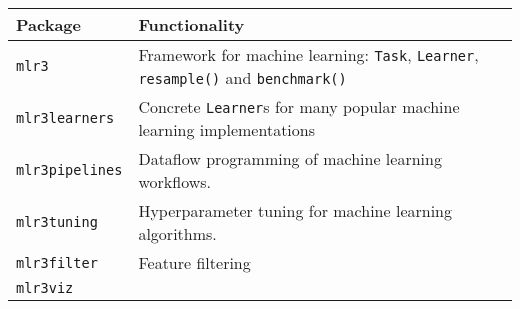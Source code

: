 \documentclass[]{article}
\begin{document}
\begin{longtable}[]{@{}ll@{}}
\toprule
\begin{minipage}[b]{0.13\columnwidth}\raggedright
Package\strut
\end{minipage} & \begin{minipage}[b]{0.82\columnwidth}\raggedright
Functionality\strut
\end{minipage}\tabularnewline
\midrule
\endhead
\begin{minipage}[t]{0.13\columnwidth}\raggedright
\texttt{mlr3}\strut
\end{minipage} & \begin{minipage}[t]{0.82\columnwidth}\raggedright
Framework for machine learning: \texttt{Task}, \texttt{Learner},
\texttt{resample()} and \texttt{benchmark()}\strut
\end{minipage}\tabularnewline
\begin{minipage}[t]{0.13\columnwidth}\raggedright
\texttt{mlr3learners}\strut
\end{minipage} & \begin{minipage}[t]{0.82\columnwidth}\raggedright
Concrete \texttt{Learner}s for many popular machine learning
implementations\strut
\end{minipage}\tabularnewline
\begin{minipage}[t]{0.13\columnwidth}\raggedright
\texttt{mlr3pipelines}\strut
\end{minipage} & \begin{minipage}[t]{0.82\columnwidth}\raggedright
Dataflow programming of machine learning workflows.\strut
\end{minipage}\tabularnewline
\begin{minipage}[t]{0.13\columnwidth}\raggedright
\texttt{mlr3tuning}\strut
\end{minipage} & \begin{minipage}[t]{0.82\columnwidth}\raggedright
Hyperparameter tuning for machine learning algorithms.\strut
\end{minipage}\tabularnewline
\begin{minipage}[t]{0.13\columnwidth}\raggedright
\texttt{mlr3filter}\strut
\end{minipage} & \begin{minipage}[t]{0.82\columnwidth}\raggedright
Feature filtering\strut
\end{minipage}\tabularnewline
\begin{minipage}[t]{0.13\columnwidth}\raggedright
\texttt{mlr3viz}\strut
\end{minipage} & \begin{minipage}[t]{0.82\columnwidth}\raggedright

\end{minipage}
\end{longtable}
\end{document}
